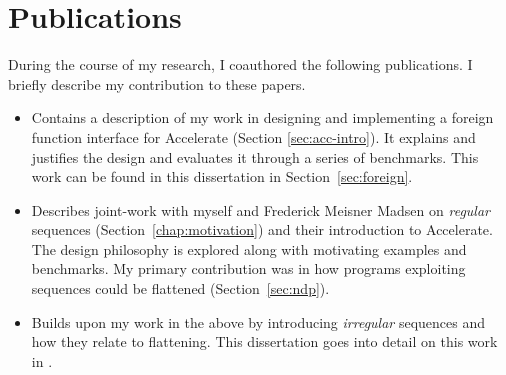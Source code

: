 \chapter{Publications}

During the course of my research, I coauthored the following publications. I briefly describe my contribution to these papers.

\begin{itemize}
\item {}

  Contains a description of my work in designing and implementing a foreign function interface for Accelerate (Section \ref{sec:acc-intro}). It explains and justifies the design and evaluates it through a series of benchmarks. This work can be found in this dissertation in Section~\ref{sec:foreign}.

\item {}

  Describes joint-work with myself and Frederick Meisner Madsen on \emph{regular} sequences (Section~\ref{chap:motivation}) and their introduction to Accelerate. The design philosophy is explored along with motivating examples and benchmarks. My primary contribution was in how programs exploiting sequences could be flattened (Section~\ref{sec:ndp}).

\item {}

  Builds upon my work in the above by introducing \emph{irregular} sequences and how they relate to flattening. This dissertation goes into detail on this work in .
\end{itemize}
